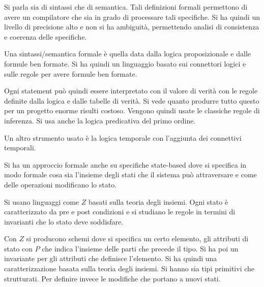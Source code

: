 Si parla sia di sintassi che di semantica. Tali definizioni formali permettono
di avere un compilatore  che sia in grado di processare tali specifiche. Si ha
quindi un livello di precisione alto e non si ha ambiguità, permettendo analisi
di consistenza e coerenza delle specifiche.

Una sintassi/semantica formale è quella data dalla logica proposizionale e dalle
formule ben formate. Si ha quindi un linguaggio basato sui connettori logici e
sulle regole per avere formule ben formate.

Ogni statement può quindi essere interpretato con il valore di verità con le
regole definite dalla logica e dalle tabelle di verità. Si vede quanto produrre
tutto questo per un progetto enorme risulti costoso. Vengono quindi usate le
classiche regole di inferenza. Si usa anche la logica predicativa del primo ordine.

Un altro strumento usato è la logica temporale con l'aggiunta dei connettivi
temporali.

Si ha un approccio formale anche su specifiche state-based dove si specifica in
modo formale cosa sia l'insieme degli stati che il sistema può attraversare e
come delle operazioni modificano lo stato.

Si usano linguaggi come $Z$ basati sulla teoria degli insiemi. Ogni stato è
caratterizzato da pre e post condizioni e si studiano le regole in termini di
invarianti che lo stato deve soddisfare.

Con $Z$ si producono schemi dove si specifica un certo elemento, gli attributi di
stato con $P$ che indica l'insieme delle parti che precede il tipo. Si ha poi un
invariante per gli attributi che definisce l'elemento. Si ha quindi una
caratterizzazione basata sulla teoria degli insiemi. Si hanno sia tipi primitivi
che strutturati. Per definire invece le modifiche che portano a nuovi stati.

